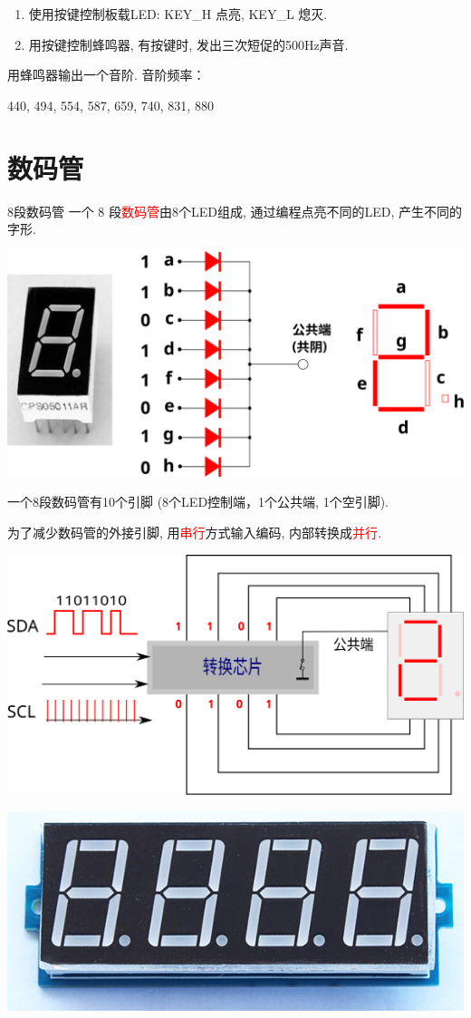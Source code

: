 \documentclass[a4paper,11pt]{seminar}
\newcommand{\alert}[1]{\textcolor{red}{#1}}
\begin{document}
\begin{enumerate}
    \item 使用按键控制板载LED: KEY\_H 点亮, KEY\_L 熄灭.

    \item 用按键控制蜂鸣器, 有按键时, 发出三次短促的500Hz声音.
\end{enumerate}
\endslide

用蜂鸣器输出一个音阶. 音阶频率：

440, 494, 554, 587, 659, 740, 831, 880
\endslide

\chapter{数码管}{8段数码管}\label{page:led8}
一个 8 段\alert{数码管}由8个LED组成, 通过编程点亮不同的LED, 产生不同的字形.

\begin{center}
\includegraphics[width=.7\textwidth]{led8}
\end{center}
一个8段数码管有10个引脚 (8个LED控制端，1个公共端, 1个空引脚).
\endslide

为了减少数码管的外接引脚, 用\alert{串行}方式输入编码, 内部转换成\alert{并行}.
\ \\
\begin{center}
\includegraphics[width=.75\textwidth]{converter}
\end{center}
\endslide

\centering
\includegraphics[width=.5\textwidth]{led4_front}
\end{document}
